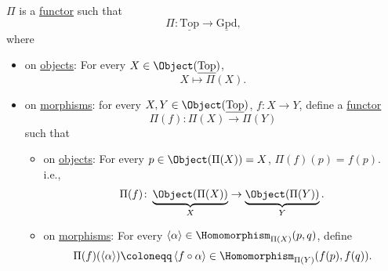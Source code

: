 \begin{theorem}\label{thm:fundamental-groupoid-defines-a-functor}
	\(\Pi\) is a \hyperref[def:functor]{functor} such that
	\[
		\Pi\colon \underline{\mathrm{Top}} \to \underline{\mathrm{Gpd}},
	\]
	where
	\begin{itemize}
		\item on \hyperref[def:object]{objects}: For every \(X\in \Object (\underline{\mathrm{Top}})\),
		      \[
			      X\mapsto \Pi (X).
		      \]
		\item on \hyperref[def:morphism]{morphisms}: for every \(X, Y\in \Object (\underline{\mathrm{Top}})\), \(f\colon X\to Y\), define a \hyperref[def:functor]{functor}
		      \[
			      \Pi (f)\colon \Pi(X)\to \Pi (Y)
		      \]
		      such that
		      \begin{itemize}
			      \item on \hyperref[def:object]{objects}: For every \(p\in \Object (\Pi (X)) = X\), \(\Pi (f)(p) = f(p)\). i.e.,
			            \[
				            \Pi (f)\colon \underbrace{\Object (\Pi (X))}_{X}\to \underbrace{\Object (\Pi (Y))}_{Y}.
			            \]
			      \item on \hyperref[def:morphism]{morphisms}: For every \(\left< \alpha  \right> \in \Homomorphism _{\Pi (X)}(p, q)\), define
			            \[
				            \Pi (f)(\left< \alpha  \right> )\coloneqq \left< f\circ \alpha  \right> \in \Homomorphism _{\Pi (Y)}(f(p), f(q)).
			            \]
		      \end{itemize}
	\end{itemize}
\end{theorem}
